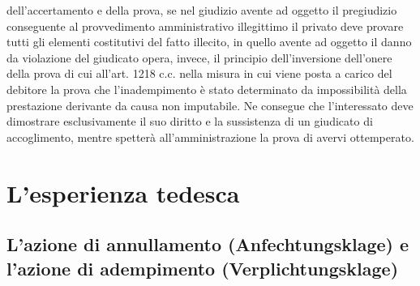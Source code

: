 \documentclass[12pt,it,a4paper,]{report}
\begin{document}
dell'accertamento e della prova, se nel giudizio avente ad oggetto il
pregiudizio conseguente al provvedimento amministrativo illegittimo il
privato deve provare tutti gli elementi costitutivi del fatto illecito,
in quello avente ad oggetto il danno da violazione del giudicato opera,
invece, il principio dell'inversione dell'onere della prova di cui
all'art. 1218 c.c. nella misura in cui viene posta a carico del debitore
la prova che l'inadempimento è stato determinato da impossibilità della
prestazione derivante da causa non imputabile. Ne consegue che
l'interessato deve dimostrare esclusivamente il suo diritto e la
sussistenza di un giudicato di accoglimento, mentre spetterà
all'amministrazione la prova di avervi ottemperato.

\hypertarget{lesperienza-tedesca}{%
\chapter{L'esperienza tedesca}\label{lesperienza-tedesca}}

\hypertarget{lazione-di-annullamento-anfechtungsklage-e-lazione-di-adempimento-verplichtungsklage}{%
\section{L'azione di annullamento (Anfechtungsklage) e l'azione di
adempimento
(Verplichtungsklage)}\label{lazione-di-annullamento-anfechtungsklage-e-lazione-di-adempimento-verplichtungsklage}}
\end{document}
